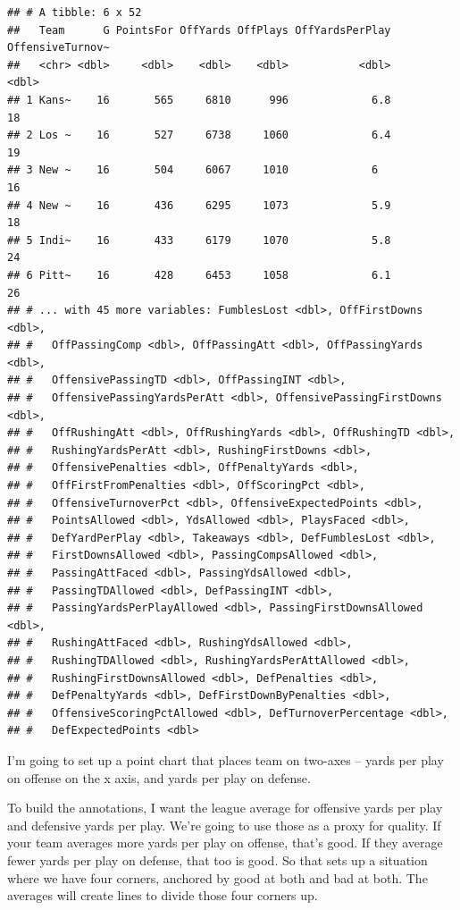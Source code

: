 \documentclass[]{book}
\begin{document}
\begin{verbatim}
## # A tibble: 6 x 52
##   Team      G PointsFor OffYards OffPlays OffYardsPerPlay OffensiveTurnov~
##   <chr> <dbl>     <dbl>    <dbl>    <dbl>           <dbl>            <dbl>
## 1 Kans~    16       565     6810      996             6.8               18
## 2 Los ~    16       527     6738     1060             6.4               19
## 3 New ~    16       504     6067     1010             6                 16
## 4 New ~    16       436     6295     1073             5.9               18
## 5 Indi~    16       433     6179     1070             5.8               24
## 6 Pitt~    16       428     6453     1058             6.1               26
## # ... with 45 more variables: FumblesLost <dbl>, OffFirstDowns <dbl>,
## #   OffPassingComp <dbl>, OffPassingAtt <dbl>, OffPassingYards <dbl>,
## #   OffensivePassingTD <dbl>, OffPassingINT <dbl>,
## #   OffensivePassingYardsPerAtt <dbl>, OffensivePassingFirstDowns <dbl>,
## #   OffRushingAtt <dbl>, OffRushingYards <dbl>, OffRushingTD <dbl>,
## #   RushingYardsPerAtt <dbl>, RushingFirstDowns <dbl>,
## #   OffensivePenalties <dbl>, OffPenaltyYards <dbl>,
## #   OffFirstFromPenalties <dbl>, OffScoringPct <dbl>,
## #   OffensiveTurnoverPct <dbl>, OffensiveExpectedPoints <dbl>,
## #   PointsAllowed <dbl>, YdsAllowed <dbl>, PlaysFaced <dbl>,
## #   DefYardPerPlay <dbl>, Takeaways <dbl>, DefFumblesLost <dbl>,
## #   FirstDownsAllowed <dbl>, PassingCompsAllowed <dbl>,
## #   PassingAttFaced <dbl>, PassingYdsAllowed <dbl>,
## #   PassingTDAllowed <dbl>, DefPassingINT <dbl>,
## #   PassingYardsPerPlayAllowed <dbl>, PassingFirstDownsAllowed <dbl>,
## #   RushingAttFaced <dbl>, RushingYdsAllowed <dbl>,
## #   RushingTDAllowed <dbl>, RushingYardsPerAttAllowed <dbl>,
## #   RushingFirstDownsAllowed <dbl>, DefPenalties <dbl>,
## #   DefPenaltyYards <dbl>, DefFirstDownByPenalties <dbl>,
## #   OffensiveScoringPctAllowed <dbl>, DefTurnoverPercentage <dbl>,
## #   DefExpectedPoints <dbl>
\end{verbatim}

I'm going to set up a point chart that places team on two-axes -- yards
per play on offense on the x axis, and yards per play on defense.

To build the annotations, I want the league average for offensive yards
per play and defensive yards per play. We're going to use those as a
proxy for quality. If your team averages more yards per play on offense,
that's good. If they average fewer yards per play on defense, that too
is good. So that sets up a situation where we have four corners,
anchored by good at both and bad at both. The averages will create lines
to divide those four corners up.
\end{document}
